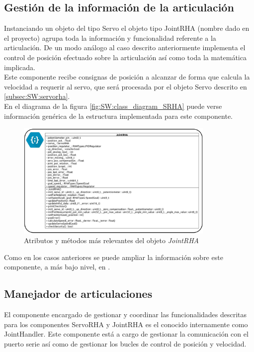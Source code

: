     \subsection{Gestión de la información de la articulación} \label{subsec:SW:jointrha}
        Instanciando un objeto del tipo Servo el objeto tipo JointRHA (nombre dado en el proyecto) agrupa toda la información y funcionalidad referente a la articulación. De un modo análogo al caso descrito anteriormente implementa el control de posición efectuado sobre la articulación así como toda la matemática implicada.
        \\
        Este componente recibe consignas de posición a alcanzar de forma que calcula la velocidad a requerir al servo, que será procesada por el objeto Servo descrito en \ref{subsec:SW:servorha}.
        \\
        En el diagrama de la figura \ref{fig:SW:class_diagram_SRHA} puede verse información genérica de la estructura implementada para este componente.
        \begin{figure}[H]
            \centering
            \includegraphics[width=0.85\textwidth]{figuras/Imagenes_SW/class_diagram_JRHA.jpg}
            \caption{Atributos y métodos más relevantes del objeto \textit{JointRHA}}
            \label{fig:SW:class_diagram_JRHA}
        \end{figure}

        Como en los casos anteriores se puede ampliar la información sobre este componente, a más bajo nivel, en \cite{rha_doc}.
        
    \subsection{Manejador de articulaciones} \label{subsec:SW:joint_handler}
    
        El componente encargado de gestionar y coordinar las funcionalidades descritas para los componentes ServoRHA y JointRHA es el conocido internamente como JointHandler. Este componente está a cargo de gestionar la comunicación con el puerto serie así como de gestionar los bucles de control de posición y velocidad.
        \\
        
